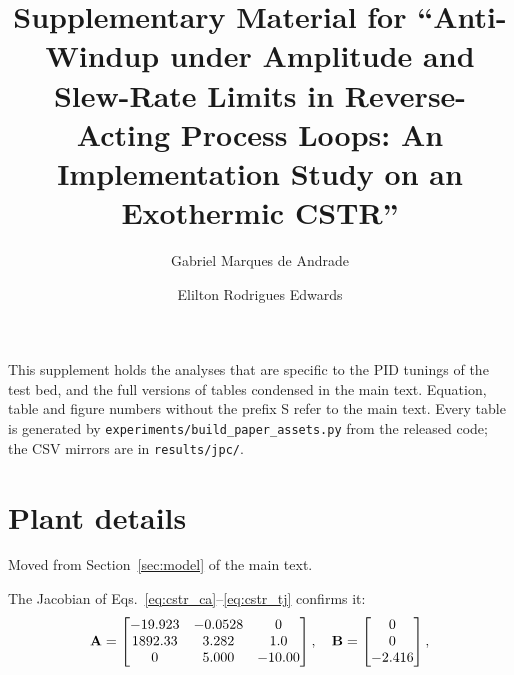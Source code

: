 \documentclass[11pt]{article}
\title{Supplementary Material for ``Anti-Windup under Amplitude and Slew-Rate Limits in Reverse-Acting Process Loops: An Implementation Study on an Exothermic CSTR''}
\author{Gabriel Marques de Andrade \and Elilton Rodrigues Edwards}
\date{}
\begin{document}
\maketitle
This supplement holds the analyses that are specific to the PID tunings of the test bed, and the full versions of tables condensed in the main text. Equation, table and figure numbers without the prefix S refer to the main text. Every table is generated by \texttt{experiments/build\_paper\_assets.py} from the released code; the CSV mirrors are in \texttt{results/jpc/}.

\section{Plant details}\label{supp:plant}
Moved from Section~\ref{sec:model} of the main text.

The Jacobian of Eqs.~\eqref{eq:cstr_ca}--\eqref{eq:cstr_tj} confirms it:
\begin{equation}
    \setlength{\arraycolsep}{5pt}
    \mathbf{A} = \begin{bmatrix}
        -19.923 & -0.0528 & 0 \\
        1892.33 & 3.282 & 1.0 \\
        0 & 5.000 & -10.00
    \end{bmatrix}, \quad
    \mathbf{B} = \begin{bmatrix} 0 \\ 0 \\ -2.416 \end{bmatrix},
    \label{eq:jacobian_matrices}
\end{equation}
\end{document}
